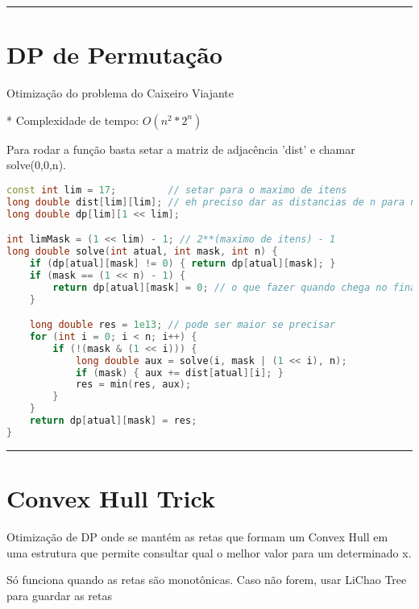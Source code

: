 \documentclass[11pt, a4paper, twoside]{book}
\begin{document}
\hfill

\rule{\textwidth}{0.4pt}

\section{DP de Permutação}



Otimização do problema do Caixeiro Viajante



* Complexidade de tempo: $O(n^2 * 2^n)$



Para rodar a função basta setar a matriz de adjacência 'dist' e chamar solve(0,0,n).


\hfill

\begin{lstlisting}[language=C++]
const int lim = 17;         // setar para o maximo de itens
long double dist[lim][lim]; // eh preciso dar as distancias de n para n
long double dp[lim][1 << lim];

int limMask = (1 << lim) - 1; // 2**(maximo de itens) - 1
long double solve(int atual, int mask, int n) {
    if (dp[atual][mask] != 0) { return dp[atual][mask]; }
    if (mask == (1 << n) - 1) {
        return dp[atual][mask] = 0; // o que fazer quando chega no final
    }

    long double res = 1e13; // pode ser maior se precisar
    for (int i = 0; i < n; i++) {
        if (!(mask & (1 << i))) {
            long double aux = solve(i, mask | (1 << i), n);
            if (mask) { aux += dist[atual][i]; }
            res = min(res, aux);
        }
    }
    return dp[atual][mask] = res;
}
\end{lstlisting}

\hfill

\rule{\textwidth}{0.4pt}

\section{Convex Hull Trick}



Otimização de DP onde se mantém as retas que formam um Convex Hull em uma estrutura que permite consultar qual o melhor valor para um determinado x.



Só funciona quando as retas são monotônicas. Caso não forem, usar LiChao Tree para guardar as retas
\end{document}
